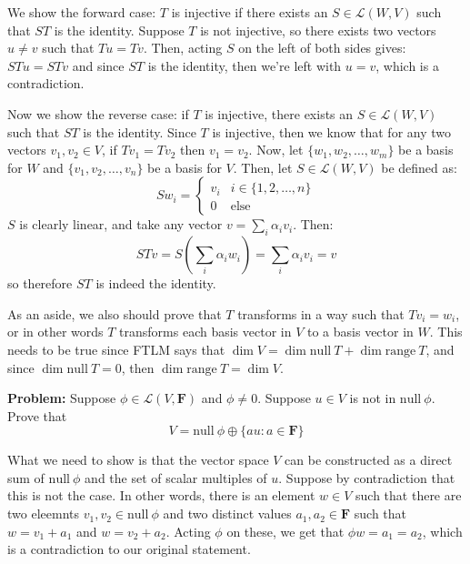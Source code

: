 \documentclass[10pt]{article}
\newcommand{\F}{\mathbf F}
\newcommand{\range}{\mathrm{range \ }}
\renewcommand{\null}{\mathrm{null \ }}
\newenvironment{problem}{\textbf{Problem:}}{}
\begin{document}
	\begin{solution}
		We show the forward case: \( T \) is injective if there exists an \( S \in \mathcal L(W, V) \) such that 
		\( ST  \) is the identity. Suppose \( T \) is not injective, so there exists two vectors \( u \neq v \) 
		such that \( Tu = Tv \). Then, acting \( S \) on the left of both sides gives:
		\( STu = STv \) and since \( ST \) is the identity, then we're left with \( u = v \), which is a contradiction. 

		Now we show the reverse case: if \( T \) is injective, there exists an \( S \in \mathcal L(W, V) \) such that 
		\( ST \) is the identity. Since  \( T \) is injective, then we know that for any two vectors 
		\( v_1, v_2 \in V \), if \( Tv_1 = Tv_2 \) then \( v_1 = v_2 \). Now, let \( \{w_1, w_2, \dots, w_m\}  \)
		be a basis for \( W \) and \( \{v_1, v_2, \dots, v_n\}  \) be a basis for \( V \). 
		Then, let \( S \in \mathcal L(W, V)\) be defined as:
		\[
		S w_i = \begin{cases}
			v_i & i \in \{1, 2, \dots, n\}\\
			0 & \text{else}
		\end{cases}
		\] 
		\( S \) is clearly linear, and take any vector \( v = \sum_i \alpha_i v_i \). Then:
		\[
		STv = S\left( \sum_i \alpha_i w_i \right) = \sum_i \alpha_i v_i = v
		\] 
		so therefore \( ST  \) is indeed the identity.

		As an aside, we also should prove that 
		\( T \) transforms in a way such that \( Tv_i = w_i \), or in other words \( T \) transforms 
		each basis vector in \( V \) to a basis vector in \( W \). This needs to be true since FTLM
		says that \( \dim V = \dim \null T + \dim \range T \), and since \( \dim \null T = 0 \), then 
		\( \dim \range T = \dim V \). 
	\end{solution}
	\begin{problem}
		Suppose \( \phi \in \mathcal L(V, \F) \) and \( \phi \neq 0 \). Suppose \( u \in V \) is not in 
		\( \null \phi \). Prove that
		\[
		V = \null \phi \oplus \{au : a \in \F \} 
		\] 
	\end{problem}

	\begin{solution}
		What we need to show is that the vector space \( V \) can be constructed as a direct sum of 
		\( \null \phi \) and the set of scalar multiples of  \( u \). Suppose by contradiction that this is 
		not the case. In other words, there is an element \( w \in V \) such that there are two eleemnts 
		\( v_1, v_2 \in \null \phi\) and two distinct values \( a_1, a_2 \in \F \) such that \( w = v_1 + a_1 \) and 
		\( w = v_2 + a_2 \). Acting \( \phi \) on these, we get that \( \phi w = a_1 = a_2 \), which 
		is a contradiction to our original statement. 
	\end{solution}
\end{document}
